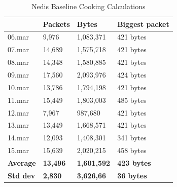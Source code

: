 \begin{table}[]
\centering
\caption{Nedis Baseline Cooking Calculations}
\label{tab:NedisBaselineCookingCalculations}
\begin{tabular}{l|l|l|l|}
\cline{2-4}
                                       & \textbf{Packets}    & \textbf{Bytes}      & \textbf{Biggest packet} \\ \hline
\multicolumn{1}{|l|}{06.mar}           & 9,976                & 1,083,371             & 421 bytes        \\ \hline
\multicolumn{1}{|l|}{07.mar}           & 14,689               & 1,575,718             & 421 bytes         \\ \hline
\multicolumn{1}{|l|}{08.mar}           & 14,348               & 1,580,885             & 421 bytes         \\ \hline
\multicolumn{1}{|l|}{09.mar}           & 17,560               & 2,093,976             & 424 bytes         \\ \hline
\multicolumn{1}{|l|}{10.mar}           & 13,786               & 1,794,198             & 421 bytes         \\ \hline
\multicolumn{1}{|l|}{11.mar}           & 15,449               & 1,803,003             & 485 bytes         \\ \hline
\multicolumn{1}{|l|}{12.mar}           & 7,967                & 987,680              & 421 bytes          \\ \hline
\multicolumn{1}{|l|}{13.mar}           & 13,449               & 1,668,571             & 421 bytes         \\ \hline
\multicolumn{1}{|l|}{14.mar}           & 12,093               & 1,408,301             & 341 bytes         \\ \hline
\multicolumn{1}{|l|}{15.mar}           & 15,639               & 2,020,215             & 458 bytes         \\ \hline
\multicolumn{1}{|l|}{\textbf{Average}} & \textbf{13,496}      & \textbf{1,601,592}  & \textbf{423 bytes} \\ \hline
\multicolumn{1}{|l|}{\textbf{Std dev}} & \textbf{2,830} & \textbf{3,626,66} & \textbf{36 bytes}     \\ \hline
\end{tabular}
\end{table}

